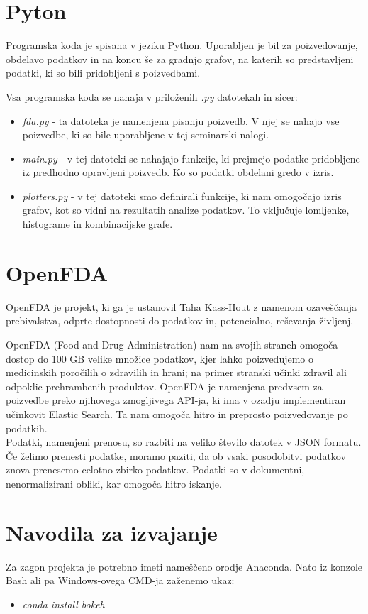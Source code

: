 \documentclass[a4paper,10pt]{article}
\begin{document}
\section{Pyton}
Programska koda je spisana v jeziku Python. Uporabljen je bil za poizvedovanje, obdelavo podatkov in na koncu še za gradnjo grafov, na katerih so predstavljeni podatki, ki so bili pridobljeni s poizvedbami.

Vsa programska koda se nahaja v priloženih \textit{.py} datotekah in sicer:
\begin{itemize}
\item{\textit{fda.py} - ta datoteka je namenjena pisanju poizvedb. V njej se nahajo vse poizvedbe, ki so bile uporabljene v tej seminarski nalogi.}
\item{\textit{main.py} - v tej datoteki se nahajajo funkcije, ki prejmejo podatke pridobljene iz predhodno opravljeni poizvedb. Ko so podatki obdelani gredo v izris.}
\item{\textit{plotters.py} - v tej datoteki smo definirali funkcije, ki nam omogočajo izris grafov, kot so vidni na rezultatih analize podatkov. To vključuje lomljenke, histograme in kombinacijske grafe.}

\end{itemize}

\section{OpenFDA}
OpenFDA je projekt, ki ga je ustanovil Taha Kass-Hout z namenom ozaveščanja prebivalstva, odprte dostopnosti do podatkov in, potencialno, reševanja življenj.

OpenFDA (Food and Drug Administration) nam na svojih straneh omogoča dostop do 100 GB velike množice podatkov, kjer lahko poizvedujemo o medicinskih poročilih o zdravilih in hrani; na primer stranski učinki zdravil ali odpoklic prehrambenih produktov. OpenFDA je namenjena predvsem za poizvedbe preko njihovega zmogljivega API-ja, ki ima v ozadju implementiran učinkovit Elastic Search. Ta nam omogoča hitro in preprosto poizvedovanje po podatkih. \\
Podatki, namenjeni prenosu, so razbiti na veliko število datotek v JSON formatu. Če želimo prenesti podatke, moramo paziti, da ob vsaki posodobitvi podatkov znova prenesemo celotno zbirko podatkov. Podatki so v dokumentni, nenormalizirani obliki, kar omogoča hitro iskanje.

\section{Navodila za izvajanje}
Za zagon projekta je potrebno imeti nameščeno orodje Anaconda. Nato iz konzole Bash ali pa Windows-ovega CMD-ja zaženemo ukaz:  \begin{itemize}
\item{\textit{conda install bokeh} }
\end{itemize}
\end{document}
